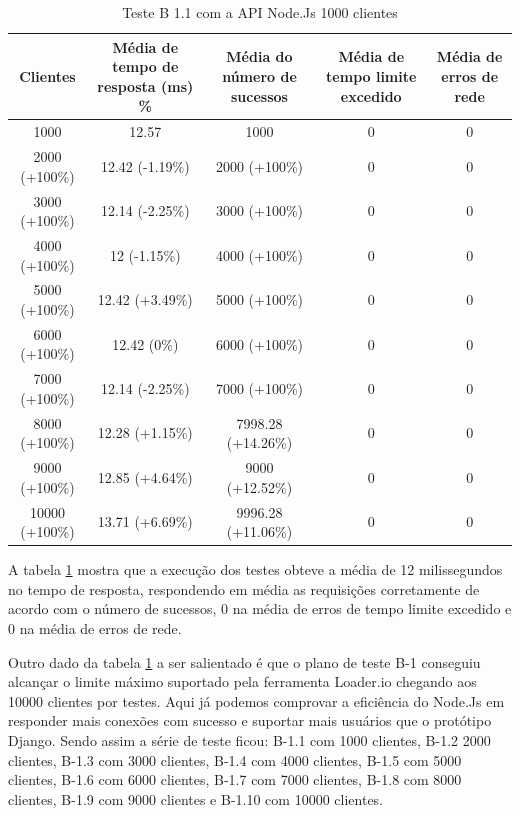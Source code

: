   \begin{table}[H]
    \centering
    \footnotesize
    \setlength{\abovecaptionskip}{0pt}
    \setlength{\belowcaptionskip}{0pt}
    \caption[Teste B-1.1 com a API 1000 clientes]{Teste B 1.1 com a API Node.Js 1000 clientes}
    \label{tab:teste-b-1-1}
    \begin{tabular}{c|c|c|c|c}
      \hline \hline
      Clientes  & 	Média de tempo de resposta (ms) \% &	Média do número de sucessos & 	Média de tempo limite excedido &	Média de erros de rede \\ 
      \hline \hline
      1000 &			12.57		 & 		1000	 		 & 		0 &					0 \\
      2000 (+100\%)&		12.42 (-1.19\%) & 		2000 (+100\%) & 			0 &					0 \\
      3000 (+100\%)&		12.14 (-2.25\%) & 		3000 (+100\%) & 			0 &					0 \\
      4000 (+100\%)&		12 (-1.15\%) & 			4000 (+100\%) & 			0 &					0 \\
      5000 (+100\%)&		12.42 (+3.49\%) & 		5000 (+100\%) & 			0 &					0 \\
      6000 (+100\%)&		12.42 (0\%) & 			6000 (+100\%) & 			0 &					0 \\
      7000 (+100\%)&		12.14 (-2.25\%) & 		7000 (+100\%) & 			0 &					0 \\
      8000 (+100\%)&		12.28 (+1.15\%) & 		7998.28 (+14.26\%) & 			0 &					0 \\
      9000 (+100\%)&		12.85 (+4.64\%) & 		9000 (+12.52\%) & 			0 &					0 \\
      10000 (+100\%)&		13.71 (+6.69\%) & 		9996.28 (+11.06\%)& 			0 &					0 \\
      \hline \hline
    \end{tabular}
  \end{table}
  
  A tabela \ref{tab:teste-b-1-1} mostra que a execução dos testes obteve a média de 12 milissegundos no tempo de resposta,
  respondendo em média as requisições corretamente de acordo com o número de sucessos, 0 na média de erros de tempo limite excedido 
  e 0 na média de erros de rede.
  
  Outro dado da tabela \ref{tab:teste-b-1-1} a ser salientado é que o plano de teste B-1 conseguiu alcançar o limite máximo suportado pela ferramenta
  Loader.io chegando aos 10000 clientes por testes. Aqui já podemos comprovar a eficiência do Node.Js em responder mais conexões com sucesso e suportar
  mais usuários que o protótipo Django. Sendo assim a série de teste ficou: B-1.1 com 1000 clientes, B-1.2 2000 clientes, 
  B-1.3 com 3000 clientes, B-1.4 com 4000 clientes, B-1.5 com 5000 clientes, B-1.6 com 6000 clientes, B-1.7 com 7000 clientes,
  B-1.8 com 8000 clientes, B-1.9 com 9000 clientes e B-1.10 com 10000 clientes.
  
